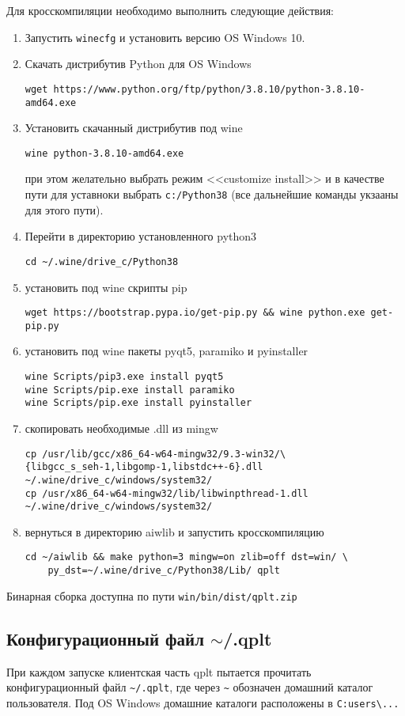 \documentclass[12pt]{article}
\begin{document}
Для кросскомпиляции необходимо выполнить следующие действия:
\begin{enumerate}
\item Запустить \verb'winecfg' и установить версию OS Windows 10.
\item Скачать дистрибутив Python для OS Windows
\begin{verbatim}
wget https://www.python.org/ftp/python/3.8.10/python-3.8.10-amd64.exe
\end{verbatim}
\item Установить скачанный дистрибутив под wine
\begin{verbatim}
wine python-3.8.10-amd64.exe
\end{verbatim}
  при этом желательно выбрать режим <<customize install>> и в качестве пути для уставноки выбрать \verb'c:/Python38' (все дальнейшие команды укзааны для этого пути).
\item Перейти в директорию установленного python3
\begin{verbatim}
cd ~/.wine/drive_c/Python38
\end{verbatim}
\item установить под wine скрипты pip
\begin{verbatim}
wget https://bootstrap.pypa.io/get-pip.py && wine python.exe get-pip.py
\end{verbatim}
\item установить под wine пакеты pyqt5, paramiko и pyinstaller
\begin{verbatim}
wine Scripts/pip3.exe install pyqt5
wine Scripts/pip.exe install paramiko
wine Scripts/pip.exe install pyinstaller
\end{verbatim}
\item скопировать необходимые .dll из mingw
\begin{verbatim}
cp /usr/lib/gcc/x86_64-w64-mingw32/9.3-win32/\
{libgcc_s_seh-1,libgomp-1,libstdc++-6}.dll ~/.wine/drive_c/windows/system32/
cp /usr/x86_64-w64-mingw32/lib/libwinpthread-1.dll ~/.wine/drive_c/windows/system32/
\end{verbatim}
\item вернуться в директорию aiwlib  и запустить кросскомпиляцию
\begin{verbatim}
cd ~/aiwlib && make python=3 mingw=on zlib=off dst=win/ \
    py_dst=~/.wine/drive_c/Python38/Lib/ qplt
\end{verbatim}
\end{enumerate}
Бинарная сборка доступна по пути \verb'win/bin/dist/qplt.zip'

\subsection{Конфигурационный файл $\sim$/.qplt}
При каждом  запуске клиентская часть qplt пытается прочитать конфигурационный файл \verb'~/.qplt', где через \verb'~' обозначен домашний каталог пользователя.
Под OS Windows домашние каталоги расположены в \verb'C:users\...'
\end{document}
